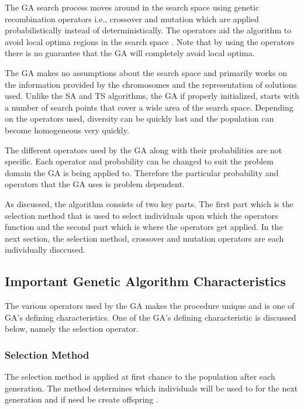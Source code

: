 The \gls{GA} search process moves around in the search space using genetic recombination operators i.e., crossover and mutation which are applied probabilistically instead of deterministically\cite{FamilyGA}. The operators aid the algorithm to avoid local optima regions in the search space \cite{HybridIntelliGA}. Note that by using the operators there is no guarantee that the \gls{GA} will completely avoid local optima\cite{CompuIntelligenceIntro}.

The \gls{GA} makes no assumptions about the search space and primarily works on the information provided by the chromosomes and the representation of solutions used\cite{CompuIntelligenceIntro,ConstrainedGA,HybridIntelliGA}. Unlike the \gls{SA} and \gls{TS} algorithms, the \gls{GA} if properly initialized, starts with a number of search points that cover a wide area of the search space. Depending on the operators used, diversity can be quickly lost and the population can become homogeneous very quickly\cite{DistributedHierarchicalGA,FamilyGA,HybridIntelliGA}\label{GASearchPoints}.
 
The different operators used by the GA along with their probabilities are not specific. Each operator and probability can be changed to suit the problem domain the GA is being applied to. Therefore the particular probability and operators that the GA uses is problem dependent.

As discussed, the algorithm consists of two key parts. The first part which is the selection method that is used to select individuals upon which the operators function and the second part which is where the operators get applied. In the next section, the selection method, crossover and mutation operators are each individually disccused.

\subsection{Important Genetic Algorithm Characteristics}
The various operators used by the \gls{GA} makes the procedure unique and is one of \gls{GA}'s defining characteristics. One of the \gls{GA}'s defining characteristic is discussed below, namely the selection operator.

\subsubsection{Selection Method}
The selection method is applied at first chance to the population after each generation. The method determines which individuals will be used to for the next generation and if need be create offspring \cite{CoactiveFuzzyGA,CombinedBranchBoundGA,ConstrainedGA}.

